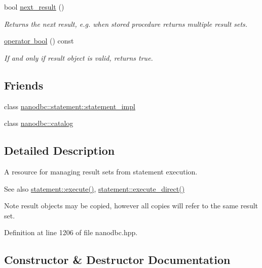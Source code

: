 \begin{DoxyCompactItemize}
bool \mbox{\hyperlink{classnanodbc_1_1result_a9cb9d5325c3ce58e7c48c1e4da1a99bb}{next\+\_\+result}} ()
\begin{DoxyCompactList}\small\item\em Returns the next result, e.\+g. when stored procedure returns multiple result sets. \end{DoxyCompactList}\item 
\mbox{\hyperlink{classnanodbc_1_1result_a235653804363793ffe2e8300160694f6}{operator bool}} () const
\begin{DoxyCompactList}\small\item\em If and only if result object is valid, returns true. \end{DoxyCompactList}\end{DoxyCompactItemize}
\subsection*{Friends}
\begin{DoxyCompactItemize}
\item 
class \mbox{\hyperlink{classnanodbc_1_1result_aef4143376fa8878d00721aca642cbfee}{nanodbc\+::statement\+::statement\+\_\+impl}}
\item 
class \mbox{\hyperlink{classnanodbc_1_1result_af0f3134c7f6f1f36bfe1e247318dfe43}{nanodbc\+::catalog}}
\end{DoxyCompactItemize}


\subsection{Detailed Description}
A resource for managing result sets from statement execution. 

\begin{DoxySeeAlso}{See also}
\mbox{\hyperlink{classnanodbc_1_1statement_ab30dac3e4defd5a90181202e99ee8ca5}{statement\+::execute()}}, \mbox{\hyperlink{classnanodbc_1_1statement_af070dc29a840854e261bda5761318cf0}{statement\+::execute\+\_\+direct()}} 
\end{DoxySeeAlso}
\begin{DoxyNote}{Note}
result objects may be copied, however all copies will refer to the same result set. 
\end{DoxyNote}


Definition at line 1206 of file nanodbc.\+hpp.



\subsection{Constructor \& Destructor Documentation}
\mbox{\label{classnanodbc_1_1result_ad4d59619a46d67bbc171d0d5c9e84705}} 
